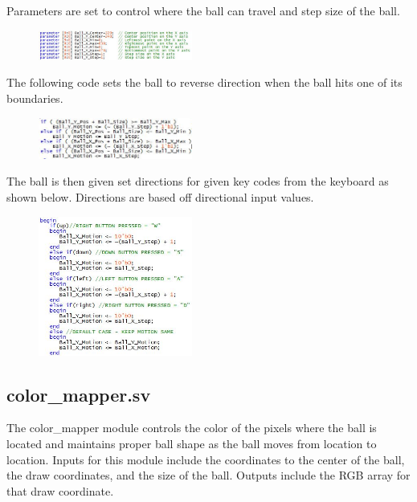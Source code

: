 \documentclass[journal, twocolumn, final,11pt,letterpaper]{IEEEtran}
\begin{document}
Parameters are set to control where the ball can travel and step size of the ball.

\begin{figure}[h]
	\centering
	\includegraphics[width=0.45\textwidth]{ballparam.jpg}
	\label{fig:ballparam}
\end{figure}

The following code sets the ball to reverse direction when the ball hits one of its boundaries. \\

\begin{figure}[h]
	\centering
	\includegraphics[width=0.45\textwidth]{ballboundary.jpg}
	\label{fig:ballboundary}
\end{figure}

The ball is then given set directions for given key codes from the keyboard as shown below.  Directions are based off directional input values.\\

\begin{figure}[h]
	\centering
	\includegraphics[width=0.45\textwidth]{ballkey.jpg}
	\label{fig:ballkey}
\end{figure}


\subsection{color\_mapper.sv}
The color\_mapper module controls the color of the pixels where the ball is located and maintains proper ball shape as the ball moves from location to location.  Inputs for this module include the coordinates to the center of the ball, the draw coordinates, and the size of the ball.  Outputs include the RGB array for that draw coordinate. \\
\end{document}

